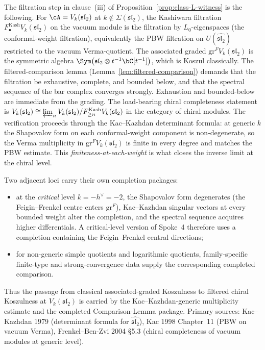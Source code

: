 \begin{remark}
\label{rem:kac-moody-filtered-comparison}
The filtration step in clause~(iii) of
Proposition~\ref{prop:class-L-witness} is the following.  For
$\cA=V_k(\mathfrak{sl}_2)$ at
$k\notin\Sigma(\mathfrak{sl}_2)$, the
Kashiwara filtration $F^{\mathrm{Kash}}_\bullet V_k(\mathfrak{sl}_2)$
on the vacuum module is the filtration by $L_0$-eigenspaces (the
conformal-weight filtration), equivalently the PBW filtration on
$U(\widehat{\mathfrak{sl}_2})$ restricted to the vacuum
Verma-quotient. The associated graded
$\mathrm{gr}^F V_k(\mathfrak{sl}_2)$ is the symmetric algebra
$\Sym\bigl(\mathfrak{sl}_2\otimes t^{-1}\bC[t^{-1}]\bigr)$, which
is Koszul classically.
The filtered-comparison lemma
(Lemma~\ref{lem:filtered-comparison}) demands that the filtration
be exhaustive, complete, and bounded below, and that the spectral
sequence of the bar complex converges strongly. Exhaustion and
bounded-below are immediate from the grading.  The load-bearing
chiral completeness statement is
$V_k(\mathfrak{sl}_2)\cong
\varprojlim_n V_k(\mathfrak{sl}_2)/F^{\mathrm{Kash}}_{\geq n}
V_k(\mathfrak{sl}_2)$ in the category of chiral modules.  The
verification proceeds through the Kac--Kazhdan determinant
formula: at generic $k$ the Shapovalov form on each conformal-weight
component is non-degenerate, so the Verma multiplicity in
$\mathrm{gr}^F V_k(\mathfrak{sl}_2)$ is finite in every degree and
matches the PBW estimate. This \emph{finiteness-at-each-weight} is
what closes the inverse limit at the chiral level.

Two adjacent loci carry their own completion packages:
\begin{itemize}
\item[(a)] at the \emph{critical} level $k=-h^\vee=-2$, the
Shapovalov form degenerates (the Feigin--Frenkel centre enters
$\mathrm{gr}^F$), Kac--Kazhdan singular vectors at every bounded
weight alter the completion, and the spectral sequence acquires
higher differentials.  A critical-level version of Spoke~4 therefore
uses a completion containing the Feigin--Frenkel central directions;
\item[(b)] for non-generic simple quotients and logarithmic
quotients, family-specific finite-type and strong-convergence data
supply the corresponding completed comparison.
\end{itemize}
Thus the passage from classical associated-graded Koszulness to
filtered chiral Koszulness at $V_k(\mathfrak{sl}_2)$ is carried by the
Kac--Kazhdan-generic multiplicity estimate and the completed
Comparison-Lemma package.  Primary
sources: Kac--Kazhdan 1979 (determinant formula for
$\widehat{\mathfrak{sl}_2}$), Kac 1998 Chapter~11 (PBW on vacuum
Verma), Frenkel--Ben-Zvi 2004 \S5.3 (chiral completeness of vacuum
modules at generic level).
\end{remark}

